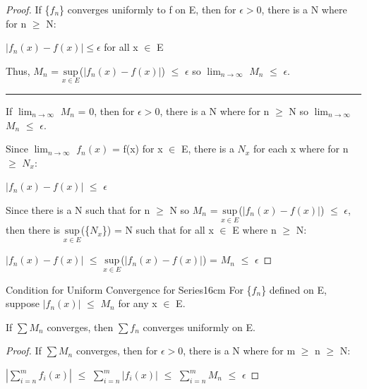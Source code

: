    \begin{proof}
        If \{$f_n$\} converges uniformly to f on E, then
        for $\epsilon > 0$, there is a N where for n $\geq$ N:

        \hspace{0.5cm}
        $|f_n(x) - f(x)| \leq \epsilon$
        \hspace{1cm}
        for all x $\in$ E

        Thus, $M_n$ = $\underset{x \in E}{\text{sup}}$($|f_n(x) - f(x)|$)
        $\leq$ $\epsilon$ so $\lim_{n \rightarrow \infty}$ $M_n$ $\leq$ $\epsilon$.

        \rule[0.1cm]{15cm}{0.01cm}

        If $\lim_{n \rightarrow \infty}$ $M_n$ = 0, then for $\epsilon > 0$,
        there is a N where for n $\geq$ N so
        $\lim_{n \rightarrow \infty}$ $M_n$ $\leq$ $\epsilon$.

        Since $\lim_{n \rightarrow \infty}$ $f_n(x)$ = f(x) for x $\in$ E,
        there is a $N_x$ for each x where for n $\geq$ $N_x$:

        \hspace{0.5cm}
        $|f_n(x) - f(x)|$
        $\leq$ $\epsilon$

        Since there is a N such that for n $\geq$ N so $M_n$
        = $\underset{x \in E}{\text{sup}}$($|f_n(x) - f(x)|$) $\leq$ $\epsilon$,
        then there is $\underset{x \in E}{\text{sup}}$(\{$N_x$\}) = N
        such that for all x $\in$ E where n $\geq$ N:

        \hspace{0.5cm}
        $|f_n(x) - f(x)|$
        $\leq$ $\underset{x \in E}{\text{sup}}$($|f_n(x) - f(x)|$)
        = $M_n$ $\leq$ $\epsilon$
    \end{proof}

    \vspace{0.5cm}



    \begin{wtheorem}{Condition for Uniform Convergence for Series}{16cm}
        For \{$f_n$\} defined on E, suppose $|f_n(x)|$ $\leq$ $M_n$ for any x $\in$ E.

        If $\sum M_n$ converges, then $\sum f_n$ converges uniformly on E.        
    \end{wtheorem}
    
    \begin{proof}
        If $\sum M_n$ converges, then for $\epsilon > 0$, there is a N where
        for m $\geq$ n $\geq$ N:

        \hspace{0.5cm}
        $|\sum_{i=n}^m f_i(x)|$
        $\leq$ $\sum_{i=n}^m |f_i(x)|$
        $\leq$ $\sum_{i=n}^m M_n$
        $\leq$ $\epsilon$    
    \end{proof}

